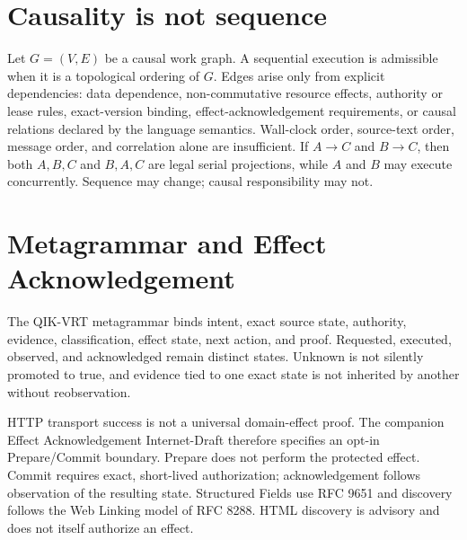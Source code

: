 \documentclass[11pt,a4paper]{article}
\begin{document}
\section{Causality is not sequence}
Let $G=(V,E)$ be a causal work graph. A sequential execution is admissible when it is a topological ordering of $G$. Edges arise only from explicit dependencies: data dependence, non-commutative resource effects, authority or lease rules, exact-version binding, effect-acknowledgement requirements, or causal relations declared by the language semantics. Wall-clock order, source-text order, message order, and correlation alone are insufficient. If $A\rightarrow C$ and $B\rightarrow C$, then both $A,B,C$ and $B,A,C$ are legal serial projections, while $A$ and $B$ may execute concurrently. Sequence may change; causal responsibility may not.

\section{Metagrammar and Effect Acknowledgement}
The QIK-VRT metagrammar binds intent, exact source state, authority, evidence, classification, effect state, next action, and proof. Requested, executed, observed, and acknowledged remain distinct states. Unknown is not silently promoted to true, and evidence tied to one exact state is not inherited by another without reobservation.

HTTP transport success is not a universal domain-effect proof. The companion Effect Acknowledgement Internet-Draft therefore specifies an opt-in Prepare/Commit boundary. Prepare does not perform the protected effect. Commit requires exact, short-lived authorization; acknowledgement follows observation of the resulting state. Structured Fields use RFC 9651 and discovery follows the Web Linking model of RFC 8288. HTML discovery is advisory and does not itself authorize an effect.
\end{document}
